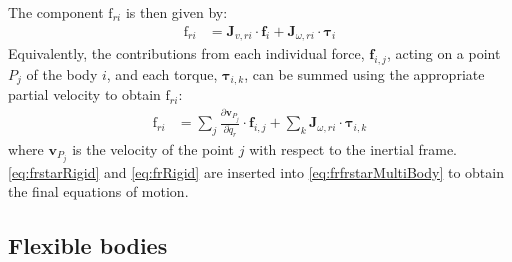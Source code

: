 \documentclass[wes, manuscript]{copernicus}
\renewcommand{\v}[1]{\boldsymbol{#1}}
\newcommand{\kanef}{\mathrm{f}}
\begin{document}
The component $\kanef_{ri}$ is then given by:
\begin{align}
   \kanef_{ri} &= \v{J}_{v,ri} \cdot \v{f}_i  + \v{J}_{\omega,ri} \cdot \v{\tau}_i
    \label{eq:frRigid}
\end{align}
Equivalently, the contributions from each individual force, $\v{f}_{i,j}$, acting on a point $P_j$ of the body $i$, and each torque, $\v{\tau}_{i,k}$, can be summed using the appropriate partial velocity to obtain $\kanef_{ri}$:
\begin{align}
   \kanef_{ri} &= \sum_j \frac{\partial \v{v}_{P_j}}{\partial \dot{q}_r} \cdot \v{f}_{i,j}  + \sum_k \v{J}_{\omega,ri} \cdot \v{\tau}_{i,k}
\end{align}
where $\v{v}_{P_j}$ is the velocity of the point $j$ with respect to the inertial frame.
\autoref{eq:frstarRigid} and \autoref{eq:frRigid}
are inserted into \autoref{eq:frfrstarMultiBody} to obtain the final equations of motion.




\subsection{Flexible bodies}
\label{sec:flexiblebodies}
\end{document}

